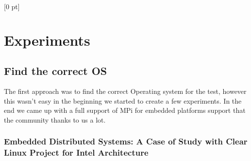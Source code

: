 \titlespacing{\chapter}{0 pt}{30 pt}{50 pt}[0 pt]
\titleformat{\section}{\Large\bfseries}{\thesection}{0 pt}{\hspace{30 pt}}
\titleformat{\subsection}{\large\bfseries}{\thesubsection}{0 pt}{\hspace{30 pt}}
\pagestyle{fancy}
\fancyhead[LO,LE]{\footnotesize\emph{\leftmark}}
\fancyhead[RO,RE]{\thepage}
\fancyfoot[CO,CE]{}

\chapter{Experiments}

\normalsize
\noindent

\section{Find the correct OS}
\noindent

    The first approach was to find the correct Operating system for the test,
    however this wasn't easy in the beginning we started to create a few
    experiments. In the end we came up with a full support of MPi for embedded
    platforms support that the community thanks to us a lot.

    \subsection {Embedded Distributed Systems: A Case of Study with Clear Linux
    Project for Intel Architecture}
    \noindent



